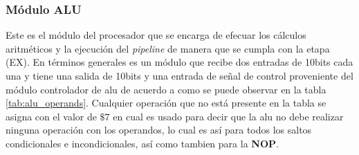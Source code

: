 \subsubsection{M\' odulo ALU}

Este es el m\' odulo del procesador que se encarga de efecuar los c\' alculos aritm\' eticos y la ejecuci\' on del \textit{pipeline} de manera que se cumpla con la etapa (EX). En t\' erminos generales es un m\' odulo que recibe dos entradas de 10bits cada una y tiene una salida de 10bits y una entrada de se\~ nal de control proveniente del m\' odulo controlador de alu de acuerdo a como se puede observar en la tabla \ref{tab:alu_operands}. Cualquier operaci\' on que no est\' a presente en la tabla se asigna con el valor de $\$ 7$ en cual es usado para decir que la alu no debe realizar ninguna operaci\' on con los operandos, lo cual es as\' i para todos los saltos condicionales e incondicionales, as\' i como tambien para la \textbf{NOP}. 


